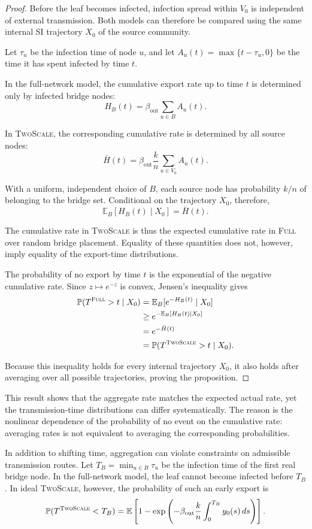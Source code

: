 \documentclass[a4paper,fleqn]{cas-sc}
\newcommand{\Full}{\textup{\textsc{Full}}}
\newcommand{\TS}{\textup{\textsc{TwoScale}}}
\begin{document}
\begin{proof}
Before the leaf becomes infected, infection spread within $V_0$ is independent of external transmission. Both models can therefore be compared using the same internal SI trajectory $X_0$ of the source community.

Let $\tau_u$ be the infection time of node $u$, and let $A_u(t)=\max\{t-\tau_u,0\}$ be the time it has spent infected by time $t$.

In the full-network model, the cumulative export rate up to time $t$ is determined only by infected bridge nodes:
\[
H_B(t)
=
\beta_{\mathrm{out}}\sum_{u\in B}A_u(t).
\]

In \TS{}, the corresponding cumulative rate is determined by all source nodes:
\[
\bar H(t)
=
\beta_{\mathrm{out}}\frac{k}{n}
\sum_{u\in V_0}A_u(t).
\]

With a uniform, independent choice of $B$, each source node has probability $k/n$ of belonging to the bridge set. Conditional on the trajectory $X_0$, therefore,
\[
\mathbb{E}_B[H_B(t)\mid X_0]
=
\bar H(t).
\]

The cumulative rate in \TS{} is thus the expected cumulative rate in \Full{} over random bridge placement. Equality of these quantities does not, however, imply equality of the export-time distributions.

The probability of no export by time $t$ is the exponential of the negative cumulative rate. Since $z\mapsto e^{-z}$ is convex, Jensen's inequality gives
\[
\begin{aligned}
\mathbb{P}(T^{\Full}>t\mid X_0)
&=
\mathbb{E}_B[e^{-H_B(t)}\mid X_0]
\\
&\geq
e^{-\mathbb{E}_B[H_B(t)\mid X_0]}
\\
&=
e^{-\bar H(t)}
\\
&=
\mathbb{P}(T^{\TS}>t\mid X_0).
\end{aligned}
\]

Because this inequality holds for every internal trajectory $X_0$, it also holds after averaging over all possible trajectories, proving the proposition.
\end{proof}

This result shows that the aggregate rate matches the expected actual rate, yet the transmission-time distributions can differ systematically. The reason is the nonlinear dependence of the probability of no event on the cumulative rate: averaging rates is not equivalent to averaging the corresponding probabilities.

In addition to shifting time, aggregation can violate constraints on admissible transmission routes. Let $T_B=\min_{u\in B}\tau_u$ be the infection time of the first real bridge node. In the full-network model, the leaf cannot become infected before $T_B$. In ideal \TS{}, however, the probability of such an early export is
\begin{equation}
\label{eq:bypass}
\mathbb{P}(T^{\TS}<T_B)
=
\mathbb{E}\left[
1-\exp\left(
-\beta_{\mathrm{out}}\frac{k}{n}
\int_0^{T_B}y_0(s)\,ds
\right)
\right].
\end{equation}
\end{document}
